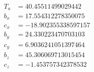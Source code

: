 \[
\begin{array}{rl}
T_a&=40.45511499029442\\
b_x&=17.554312278350075\\
c_x&=-18.902355338597157\\
b_y&=24.330223470703103\\
c_y&=6.9036241051397464\\
b_z&=45.306069713015454\\
c_z&=-1.453757342378532\\
\end{array}
\]
